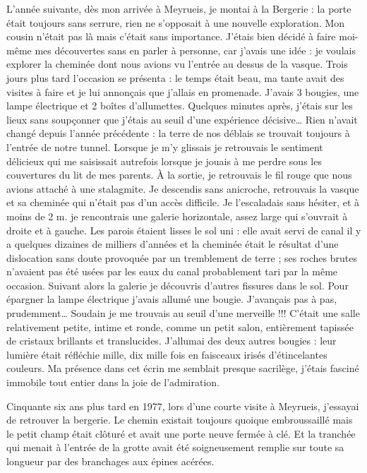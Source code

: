 

L’année suivante, dès mon arrivée à Meyrueis, je montai à la Bergerie : la porte était toujours
sans serrure, rien ne s’opposait à une nouvelle exploration. Mon cousin n’était pas là mais
c’était sans importance. J’étais bien décidé à faire moi-même mes découvertes sans en parler à
personne, car j’avais une idée : je voulais explorer la cheminée dont nous avions vu l’entrée
au dessus de la vasque. Trois jours plus tard l’occasion se présenta : le temps était beau, ma
tante avait des visites à faire et je lui annonçais que j’allais en promenade. J’avais 3 bougies,
une lampe électrique et 2 boîtes d’allumettes. Quelques minutes après, j’étais sur les lieux
sans soupçonner que j’étais au seuil d’une expérience décisive…
Rien n’avait changé depuis l’année précédente : la terre de nos déblais se trouvait toujours à
l’entrée de notre tunnel. Lorsque je m’y glissais je retrouvais le sentiment délicieux qui me
saisissait autrefois lorsque je jouais à me perdre sous les couvertures du lit de mes parents. À
la sortie, je retrouvais le fil rouge que nous avions attaché à une stalagmite. Je descendis sans
anicroche, retrouvais la vasque et sa cheminée qui n’était pas d’un accès difficile. Je
l’escaladais sans hésiter, et à moins de 2 m. je rencontrais une galerie horizontale, assez large
qui s’ouvrait à droite et à gauche. Les parois étaient lisses le sol uni : elle avait servi de canal
il y a quelques dizaines de milliers d’années et la cheminée était le résultat d’une dislocation
sans doute provoquée par un tremblement de terre ; ses roches brutes n’avaient pas été usées
par les eaux du canal probablement tari par la même occasion. Suivant alors la galerie je
découvris d’autres fissures dans le sol. Pour épargner la lampe électrique j’avais allumé une
bougie. J’avançais pas à pas, prudemment… Soudain je me trouvais au seuil d’une
merveille !!! C’était une salle relativement petite, intime et ronde, comme un petit salon,
entièrement tapissée de cristaux brillants et translucides. J’allumai des deux autres bougies :
leur lumière était réfléchie mille, dix mille fois en faisceaux irisés d’étincelantes couleurs. Ma
présence dans cet écrin me semblait presque sacrilège, j’étais fasciné immobile tout entier
dans la joie de l’admiration.

Cinquante six ans plus tard en 1977, lors d’une courte visite à Meyrueis, j’essayai de retrouver
la bergerie. Le chemin existait toujours quoique embroussaillé mais le petit champ était
clôturé et avait une porte neuve fermée à clé. Et la tranchée qui menait à l’entrée de la grotte
avait été soigneusement remplie sur toute sa longueur par des branchages aux épines acérées.

